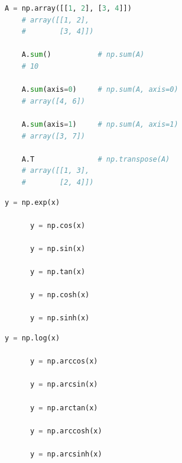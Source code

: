 \documentclass[aspectratio=169]{beamer}
\begin{document}
\begin{frame}[fragile]{}{}
  \vfill
  \begin{lstlisting}[language=Python]
    A = np.array([[1, 2], [3, 4]])
    # array([[1, 2],
    #        [3, 4]])
    
    A.sum()           # np.sum(A)
    # 10
    
    A.sum(axis=0)     # np.sum(A, axis=0)
    # array([4, 6])
    
    A.sum(axis=1)     # np.sum(A, axis=1)
    # array([3, 7])

    A.T               # np.transpose(A)
    # array([[1, 3],
    #        [2, 4]])
  \end{lstlisting}
  \vfill
\end{frame}




\begin{frame}[fragile]{}{}
  \vfill
  \begin{minipage}{.48\textwidth}
    \begin{lstlisting}[language=Python]
      y = np.exp(x)
      
      y = np.cos(x)
      
      y = np.sin(x)
      
      y = np.tan(x)
      
      y = np.cosh(x)
      
      y = np.sinh(x)
    \end{lstlisting}
  \end{minipage}%
  \hfill
  \begin{minipage}{.48\textwidth}
    \begin{lstlisting}[language=Python]
      y = np.log(x)

      y = np.arccos(x)
      
      y = np.arcsin(x)
      
      y = np.arctan(x)
      
      y = np.arccosh(x)
      
      y = np.arcsinh(x)
    \end{lstlisting}
  \end{minipage}
  \vfill
\end{frame}
\end{document}

